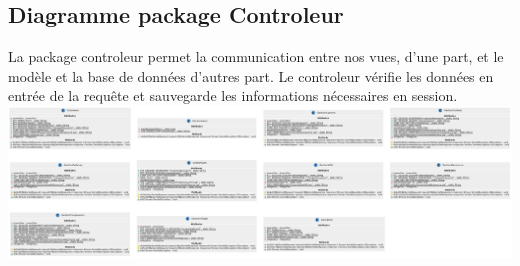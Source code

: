         \subsection{Diagramme package Controleur}
        La package controleur permet la communication entre nos vues, d'une part, et le modèle et la base de données d'autres part. Le controleur vérifie les données en entrée de la requête et sauvegarde les informations nécessaires en session. \\
            \includegraphics[scale=0.2]{ressources/images/ClassesControleur.png}
